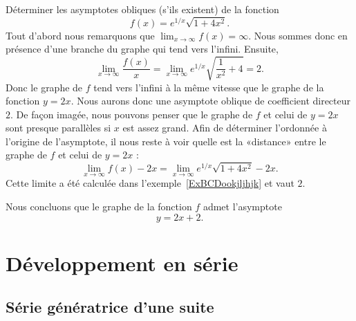 \begin{example}
	Déterminer les asymptotes obliques (s'ils existent) de la fonction
	\begin{equation}
		f(x)= e^{1/x}\sqrt{1+4x^2}.
	\end{equation}
	Tout d'abord nous remarquons que \( \lim_{x\to \infty} f(x)=\infty\). Nous sommes donc en présence d'une branche du graphe qui tend vers l'infini. Ensuite,
	\begin{equation}
		\lim_{x\to \infty} \frac{ f(x) }{ x }=\lim_{x\to \infty}  e^{1/x}\sqrt{\frac{1}{ x^2 }+4}=2.
	\end{equation}
	Donc le graphe de \( f\) tend vers l'infini à la même vitesse que le graphe de la fonction \( y=2x\). Nous aurons donc une asymptote oblique de coefficient directeur \( 2\). De façon imagée, nous pouvons penser que le graphe de \( f\) et celui de \( y=2x\) sont presque parallèles si \( x\) est assez grand. Afin de déterminer l'ordonnée à l'origine de l'asymptote, il nous reste à voir quelle est la «distance» entre le graphe de \( f\) et celui de \( y=2x\) :
	\begin{equation}
		\lim_{x\to \infty} f(x)-2x=\lim_{x\to \infty}  e^{1/x}\sqrt{1+4x^2}-2x.
	\end{equation}
	Cette limite a été calculée dans l'exemple~\ref{ExBCDookjljhjk} et vaut \( 2\).

	Nous concluons que le graphe de la fonction \( f\) admet l'asymptote
	\begin{equation}
		y=2x+2.
	\end{equation}
\end{example}

\section{Développement en série}

\subsection{Série génératrice d'une suite}

